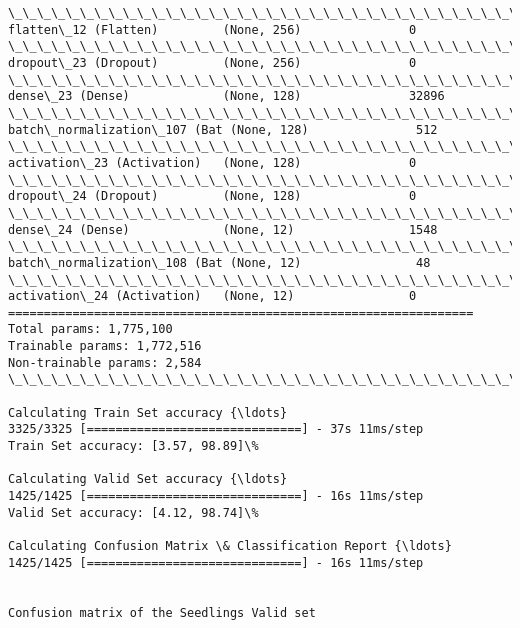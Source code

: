 \documentclass[11pt]{article}
\begin{document}
\begin{Verbatim}[commandchars=\\\{\}]
\_\_\_\_\_\_\_\_\_\_\_\_\_\_\_\_\_\_\_\_\_\_\_\_\_\_\_\_\_\_\_\_\_\_\_\_\_\_\_\_\_\_\_\_\_\_\_\_\_\_\_\_\_\_\_\_\_\_\_\_\_\_\_\_\_
flatten\_12 (Flatten)         (None, 256)               0         
\_\_\_\_\_\_\_\_\_\_\_\_\_\_\_\_\_\_\_\_\_\_\_\_\_\_\_\_\_\_\_\_\_\_\_\_\_\_\_\_\_\_\_\_\_\_\_\_\_\_\_\_\_\_\_\_\_\_\_\_\_\_\_\_\_
dropout\_23 (Dropout)         (None, 256)               0         
\_\_\_\_\_\_\_\_\_\_\_\_\_\_\_\_\_\_\_\_\_\_\_\_\_\_\_\_\_\_\_\_\_\_\_\_\_\_\_\_\_\_\_\_\_\_\_\_\_\_\_\_\_\_\_\_\_\_\_\_\_\_\_\_\_
dense\_23 (Dense)             (None, 128)               32896     
\_\_\_\_\_\_\_\_\_\_\_\_\_\_\_\_\_\_\_\_\_\_\_\_\_\_\_\_\_\_\_\_\_\_\_\_\_\_\_\_\_\_\_\_\_\_\_\_\_\_\_\_\_\_\_\_\_\_\_\_\_\_\_\_\_
batch\_normalization\_107 (Bat (None, 128)               512       
\_\_\_\_\_\_\_\_\_\_\_\_\_\_\_\_\_\_\_\_\_\_\_\_\_\_\_\_\_\_\_\_\_\_\_\_\_\_\_\_\_\_\_\_\_\_\_\_\_\_\_\_\_\_\_\_\_\_\_\_\_\_\_\_\_
activation\_23 (Activation)   (None, 128)               0         
\_\_\_\_\_\_\_\_\_\_\_\_\_\_\_\_\_\_\_\_\_\_\_\_\_\_\_\_\_\_\_\_\_\_\_\_\_\_\_\_\_\_\_\_\_\_\_\_\_\_\_\_\_\_\_\_\_\_\_\_\_\_\_\_\_
dropout\_24 (Dropout)         (None, 128)               0         
\_\_\_\_\_\_\_\_\_\_\_\_\_\_\_\_\_\_\_\_\_\_\_\_\_\_\_\_\_\_\_\_\_\_\_\_\_\_\_\_\_\_\_\_\_\_\_\_\_\_\_\_\_\_\_\_\_\_\_\_\_\_\_\_\_
dense\_24 (Dense)             (None, 12)                1548      
\_\_\_\_\_\_\_\_\_\_\_\_\_\_\_\_\_\_\_\_\_\_\_\_\_\_\_\_\_\_\_\_\_\_\_\_\_\_\_\_\_\_\_\_\_\_\_\_\_\_\_\_\_\_\_\_\_\_\_\_\_\_\_\_\_
batch\_normalization\_108 (Bat (None, 12)                48        
\_\_\_\_\_\_\_\_\_\_\_\_\_\_\_\_\_\_\_\_\_\_\_\_\_\_\_\_\_\_\_\_\_\_\_\_\_\_\_\_\_\_\_\_\_\_\_\_\_\_\_\_\_\_\_\_\_\_\_\_\_\_\_\_\_
activation\_24 (Activation)   (None, 12)                0         
=================================================================
Total params: 1,775,100
Trainable params: 1,772,516
Non-trainable params: 2,584
\_\_\_\_\_\_\_\_\_\_\_\_\_\_\_\_\_\_\_\_\_\_\_\_\_\_\_\_\_\_\_\_\_\_\_\_\_\_\_\_\_\_\_\_\_\_\_\_\_\_\_\_\_\_\_\_\_\_\_\_\_\_\_\_\_

Calculating Train Set accuracy {\ldots}
3325/3325 [==============================] - 37s 11ms/step
Train Set accuracy: [3.57, 98.89]\%

Calculating Valid Set accuracy {\ldots}
1425/1425 [==============================] - 16s 11ms/step
Valid Set accuracy: [4.12, 98.74]\%

Calculating Confusion Matrix \& Classification Report {\ldots}
1425/1425 [==============================] - 16s 11ms/step


Confusion matrix of the Seedlings Valid set



    \end{Verbatim}
\end{document}
